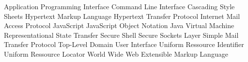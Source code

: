 \begin{acronym}[HTML]
   			{Application Programming Interface}
	      {Command Line Interface}
			{Cascading Style Sheets}
			{Hypertext Markup Language}
			{Hypertext Transfer Protocol}
			{Internet Mail Access Protocol}
			{JavaScript}
	     {JavaScript Object Notation}
			{Java Virtual Machine}
	     {Representational State Transfer}
			{Secure Shell}
			{Secure Sockets Layer}
			{Simple Mail Transfer Protocol}
			{Top-Level Domain}
			{User Interface}
	      {Uniform Ressource Identifier}
	      {Uniform Ressource Locator}
			{World Wide Web}
	      {Extensible Markup Language}
\end{acronym}
